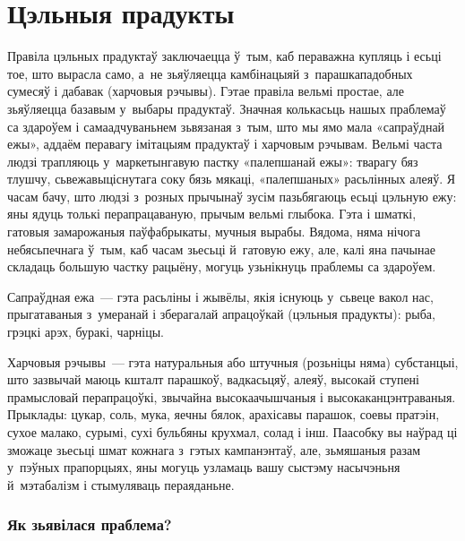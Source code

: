 \chapter{Цэльныя прадукты}

Правіла цэльных прадуктаў заключаецца ў~тым, каб пераважна купляць і есьці тое, што вырасла само, а~не зьяўляецца камбінацыяй з~парашкападобных сумесяў і дабавак (харчовыя рэчывы). Гэтае правіла вельмі простае, але зьяўляецца базавым у~выбары прадуктаў. Значная колькасьць нашых праблемаў са здароўем і самаадчуваньнем зьвязаная з~тым, што мы ямо мала «сапраўднай ежы», аддаём перавагу імітацыям прадуктаў і харчовым рэчывам. Вельмі часта людзі трапляюць у~маркетынгавую пастку «палепшанай ежы»: тварагу бяз тлушчу, сьвежавыціснутага соку бязь мякаці, «палепшаных» расьлінных алеяў. Я часам бачу, што людзі з~розных прычынаў зусім пазьбягаюць есьці цэльную ежу: яны ядуць толькі перапрацаваную, прычым вельмі глыбока. Гэта і шматкі, гатовыя замарожаныя паўфабрыкаты, мучныя вырабы. Вядома, няма нічога небясьпечнага ў~тым, каб часам зьесьці й~гатовую ежу, але, калі яна пачынае складаць большую частку рацыёну, могуць узьнікнуць праблемы са здароўем.


Сапраўдная ежа~--- гэта расьліны і жывёлы, якія існуюць у~сьвеце вакол нас, прыгатаваныя з~умеранай і зберагалай апрацоўкай (цэльныя прадукты): рыба, грэцкі арэх, буракі, чарніцы.

Харчовыя рэчывы~--- гэта натуральныя або штучныя (розьніцы няма) субстанцыі, што зазвычай маюць кшталт парашкоў, вадкасьцяў, алеяў, высокай ступені прамысловай перапрацоўкі, звычайна высокаачышчаныя і высокаканцэнтраваныя. Прыклады: цукар, соль, мука, яечны бялок, арахісавы парашок, соевы пратэін, сухое малако, сурымі, сухі бульбяны крухмал, солад і інш. Паасобку вы наўрад ці зможаце зьесьці шмат кожнага з~гэтых кампанэнтаў, але, зьмяшаныя разам у~пэўных прапорцыях, яны могуць узламаць вашу сыстэму насычэньня й~мэтабалізм і стымуляваць пераяданьне.

\subsection{Як зьявілася праблема?}

